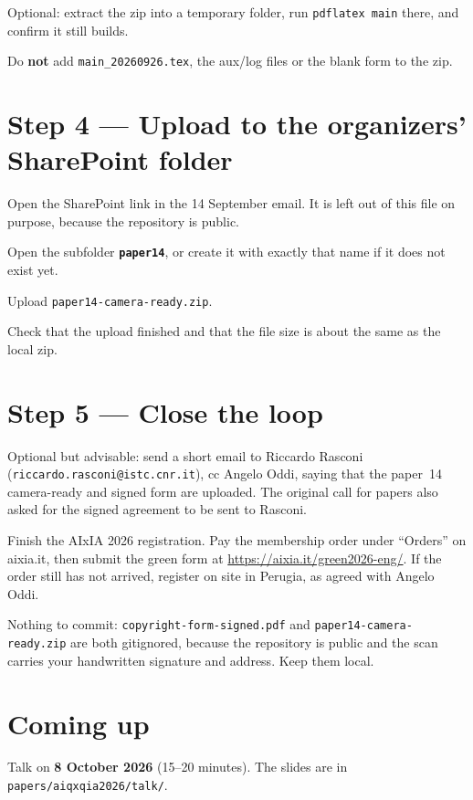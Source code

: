 \documentclass[11pt,a4paper]{article}
\begin{document}
\begin{todo}
  \item Optional: extract the zip into a temporary folder, run
    \texttt{pdflatex main} there, and confirm it still builds.
  \item Do \textbf{not} add \texttt{main\_20260926.tex}, the aux/log files
    or the blank form to the zip.
\end{todo}

\section*{Step 4 --- Upload to the organizers' SharePoint folder}
\begin{todo}
  \item Open the SharePoint link in the 14 September email. It is left out
    of this file on purpose, because the repository is public.
  \item Open the subfolder \textbf{\texttt{paper14}}, or create it with
    exactly that name if it does not exist yet.
  \item Upload \texttt{paper14-camera-ready.zip}.
  \item Check that the upload finished and that the file size is about
    the same as the local zip.
\end{todo}

\section*{Step 5 --- Close the loop}
\begin{todo}
  \item Optional but advisable: send a short email to Riccardo Rasconi
    (\texttt{riccardo.rasconi@istc.cnr.it}), cc Angelo Oddi, saying that the
    paper~14 camera-ready and signed form are uploaded. The original call
    for papers also asked for the signed agreement to be sent to Rasconi.
  \item Finish the AIxIA 2026 registration. Pay the membership order under
    ``Orders'' on aixia.it, then submit the green form at
    \url{https://aixia.it/green2026-eng/}. If the order still has not
    arrived, register on site in Perugia, as agreed with Angelo Oddi.
  \item Nothing to commit: \texttt{copyright-form-signed.pdf} and
    \texttt{paper14-camera-ready.zip} are both gitignored, because the
    repository is public and the scan carries your handwritten signature
    and address. Keep them local.
\end{todo}

\section*{Coming up}
Talk on \textbf{8 October 2026} (15--20 minutes). The slides are in
\texttt{papers/aiqxqia2026/talk/}.
\end{document}
